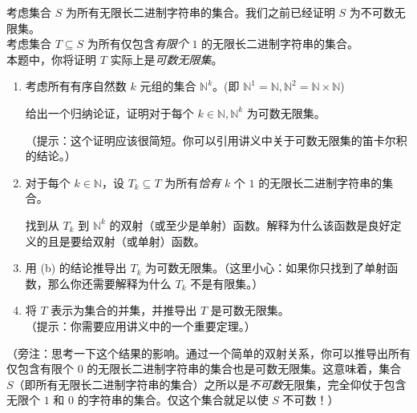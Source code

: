 \begin{exercise}
    考虑集合 $S$ 为所有无限长二进制字符串的集合。我们之前已经证明 $S$ 为不可数无限集。\\
    考虑集合 $T \subseteq S$ 为所有仅包含\emph{有限个} $1$ 的无限长二进制字符串的集合。\\
    本题中，你将证明 $T$ 实际上是\emph{可数无限集}。
    \begin{enumerate}[label=(\alph*)]
        \item 考虑所有有序自然数 $k$ 元组的集合 $\mathbb{N}^k$。(即 $\mathbb{N}^1 = \mathbb{N}, \mathbb{N}^2 = \mathbb{N} \times \mathbb{N}$)

              给出一个归纳论证，证明对于每个 $k \in \mathbb{N}, \mathbb{N}^k$ 为可数无限集。

              （提示：这个证明应该很简短。你可以引用讲义中关于可数无限集的笛卡尔积的结论。）
        \item 对于每个 $k \in \mathbb{N}$，设 $T_k \subseteq T$ 为所有\emph{恰有} $k$ 个 $1$ 的无限长二进制字符串的集合。

              找到从 $T_k$ 到 $\mathbb{N}^k$ 的双射（或至少是单射）函数。解释为什么该函数是良好定义的且是要给双射（或单射）函数。
        \item 用 (b) 的结论推导出 $T_k$ 为可数无限集。（这里小心：如果你只找到了单射函数，那么你还需要解释为什么 $T_k$ 不是有限集。）
        \item 将 $T$ 表示为集合的并集，并推导出 $T$ 是可数无限集。\\
              （提示：你需要应用讲义中的一个重要定理。）
    \end{enumerate}
    （旁注：思考一下这个结果的影响。通过一个简单的双射关系，你可以推导出所有仅包含有限个 $0$ 的无限长二进制字符串的集合也是可数无限集。这意味着，集合 $S$（即所有无限长二进制字符串的集合）之所以是\emph{不可数}无限集，完全仰仗于包含无限个 $1$ 和 $0$ 的字符串的集合。仅这个集合就足以使 $S$ 不可数！）
\end{exercise}

